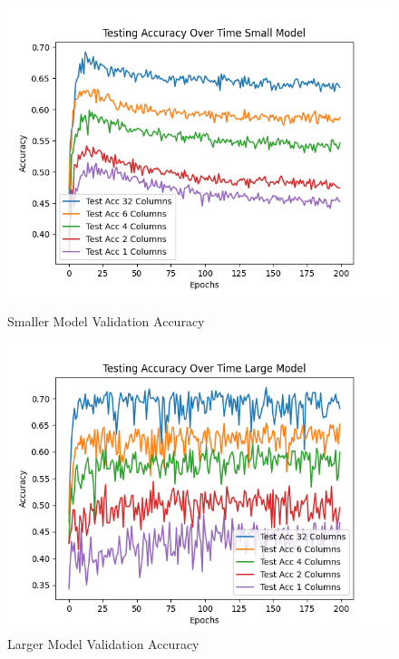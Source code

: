 \documentclass{article}
\begin{document}
\begin{figure}[!htb]
		\includegraphics[width = \linewidth]{figures/test_acc_over_time_small.png}
		\caption{Smaller Model Validation Accuracy}
	\endminipage\hfill
		\includegraphics[width = \linewidth]{figures/test_acc_over_time_large_model.png}
		\caption{Larger Model Validation Accuracy}
	\endminipage\hfill	
\end{figure}
\end{document}
